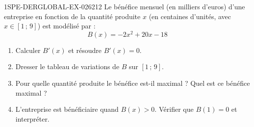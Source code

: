 \begin{exercice}{1SPE-DERGLOBAL-EX-026}{2}{12}
Le bénéfice mensuel (en milliers d'euros) d'une entreprise en fonction de la quantité produite $x$ (en centaines d'unités, avec $x \in [1\,;\,9]$) est modélisé par :
\[
B(x) = -2x^2 + 20x - 18
\]

\begin{enumerate}
\item Calculer $B'(x)$ et résoudre $B'(x) = 0$.
\item Dresser le tableau de variations de $B$ sur $[1\,;\,9]$.
\item Pour quelle quantité produite le bénéfice est-il maximal ? Quel est ce bénéfice maximal ?
\item L'entreprise est bénéficiaire quand $B(x) > 0$. Vérifier que $B(1) = 0$ et interpréter.
\end{enumerate}
\end{exercice}
